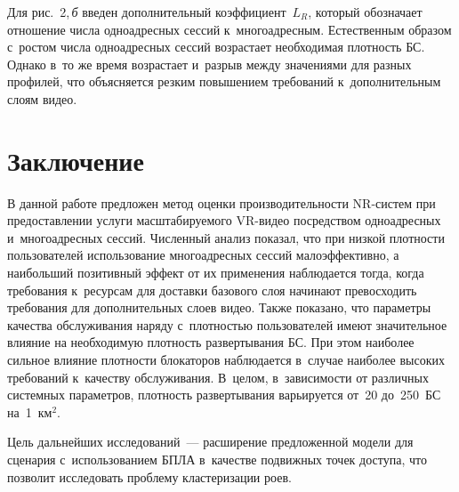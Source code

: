 \begin{multicols}{2}
  Для рис.~2,\,\textit{б} введен дополнительный коэффициент~$L_R$, который 
обозначает отношение числа одноадресных сессий к~многоадресным. 
Естественным образом с~ростом числа одноадресных сессий возрастает 
необходимая плотность БС. Однако в~то же время возрастает и~разрыв между 
значениями для разных профилей, что объясняется резким повышением 
требований к~дополнительным слоям видео.
  

\vspace*{-6pt}

\section{Заключение}

\vspace*{-4pt}
  
  В данной работе предложен метод оценки производительности NR-систем 
при предоставлении услуги масштабируемого VR-видео посредством 
одноадресных и~многоадресных сессий. Численный анализ показал, что при 
низкой плотности пользователей использование многоадресных сессий 
малоэффективно, а наибольший позитивный эффект от их применения 
наблюдается тогда, когда требования к~ресурсам для доставки базового слоя 
начинают превосходить требования для дополнительных слоев видео. Также 
показано, что параметры качества обслуживания наряду с~плотностью 
пользователей имеют значительное влияние на необходимую плотность 
развертывания БС. При этом наиболее сильное влияние 
плотности блокаторов наблюдается в~случае наиболее высоких требований 
к~качеству обслуживания. В~целом, в~за\-ви\-си\-мости от различных системных 
па\-ра\-мет\-ров, плот\-ность раз\-вер\-ты\-ва\-ния варь\-и\-ру\-ет\-ся от~20 до~250~БС на~1~км$^2$. 
  
  Цель дальнейших исследований~--- расширение предложенной модели для 
сценария с~использованием БПЛА в~качестве подвижных точек доступа, что 
позволит исследовать проблему кластеризации роев.
  

\end{multicols}

